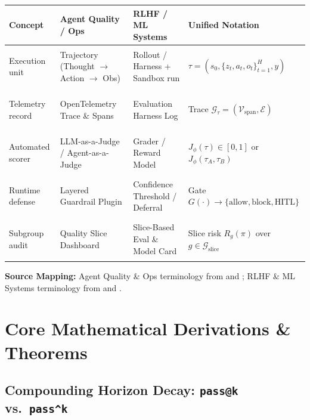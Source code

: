 \documentclass[../../../../master.tex]{subfiles}
\begin{document}
\begin{crossbook}
\label{tab:ops:notation}
\renewcommand{\arraystretch}{1.25}
\begin{tabularx}{\textwidth}{@{}>{\bfseries\raggedright\arraybackslash}p{}>{\raggedright\arraybackslash}p{}>{\raggedright\arraybackslash}p{}>{\raggedright\arraybackslash}X@{}}
\toprule
\textbf{Concept} & \textbf{Agent Quality / Ops} & \textbf{RLHF / ML Systems} & \textbf{Unified Notation} \\
\midrule
Execution unit & Trajectory (Thought $\to$ Action $\to$ Obs) & Rollout / Harness + Sandbox run & $\tau = (s_0, \{z_t, a_t, o_t\}_{t=1}^H, y)$ \\
Telemetry record & OpenTelemetry Trace \& Spans & Evaluation Harness Log & Trace $\mathcal{G}_\tau = (\mathcal{V}_{\mathrm{span}}, \mathcal{E})$ \\
Automated scorer & LLM-as-a-Judge / Agent-as-a-Judge & Grader / Reward Model & $J_\phi(\tau) \in [0,1]$ or $J_\phi(\tau_A, \tau_B)$ \\
Runtime defense & Layered Guardrail Plugin & Confidence Threshold / Deferral & Gate $G(\cdot) \to \{\mathrm{allow}, \mathrm{block}, \mathrm{HITL}\}$ \\
Subgroup audit & Quality Slice Dashboard & Slice-Based Eval \& Model Card & Slice risk $R_g(\pi)$ over $g \in \mathcal{G}_{\mathrm{slice}}$ \\
\bottomrule
\end{tabularx}

\smallskip\noindent\textbf{Source Mapping:} Agent Quality \& Ops terminology from  and ; RLHF \& ML Systems terminology from  and .
\end{crossbook}

\section{Core Mathematical Derivations \& Theorems}
\label{sec:ops:derivations}

\subsection{Compounding Horizon Decay: \texttt{pass@k} vs.\ \texttt{pass\textasciicircum k}}
\label{sec:ops:passk}
\end{document}
